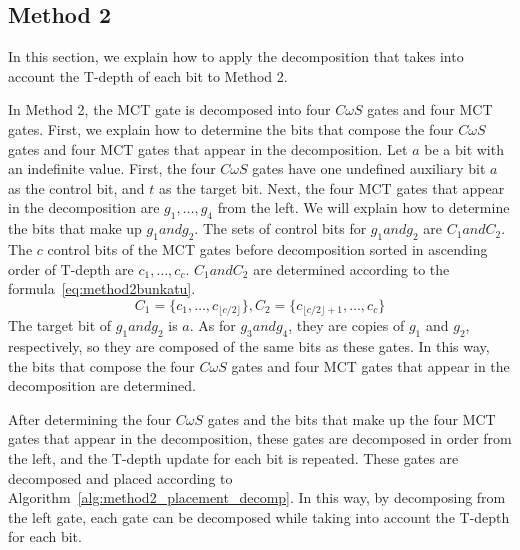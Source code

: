 \subsection{Method 2}
In this section, we explain how to apply the decomposition that takes into account the T-depth of each bit to Method 2.
\par
In Method 2, the MCT gate is decomposed into four $C\omega S$ gates and four MCT gates.
First, we explain how to determine the bits that compose the four $C\omega S$ gates and four MCT gates that appear in the decomposition.
Let $a$ be a bit with an indefinite value.
First, the four $C\omega S$ gates have one undefined auxiliary bit $a$ as the control bit,
and $t$ as the target bit.
Next, the four MCT gates that appear in the decomposition are $g_{1},\dots, g_{4}$ from the left.
We will explain how to determine the bits that make up $g_{1} and g_{2}$.
The sets of control bits for $g_{1} and g_{2}$ are $C_{1} and C_{2}$.
The $c$ control bits of the MCT gates before decomposition
sorted in ascending order of T-depth are $c_{1},\dots, c_{c}$.
$C_{1} and C_{2}$ are determined according to the formula~\ref{eq:method2bunkatu}.
\begin{equation}\label{eq:method2bunkatu}
C_{1}=\{c_{1},\dots, c_{\lfloor c/2 \rfloor}\}, C_{2}=\{c_{\lfloor c/2 \rfloor +1},\dots , c_{c}\}
\end{equation}
The target bit of $g_{1} and g_{2}$ is $a$.
As for $g_{3} and g_{4}$, they are copies of $g_{1}$ and $g_{2}$, respectively,
so they are composed of the same bits as these gates.
In this way,
the bits that compose the four $C\omega S$ gates and four MCT gates that appear in the decomposition are determined.
\par
After determining the four $C\omega S$ gates and the bits that make up the four MCT gates that appear in the decomposition,
these gates are decomposed in order from the left, and the T-depth update for each bit is repeated.
These gates are decomposed and placed according to Algorithm~\ref{alg:method2_placement_decomp}.
In this way, by decomposing from the left gate,
each gate can be decomposed while taking into account the T-depth for each bit.
